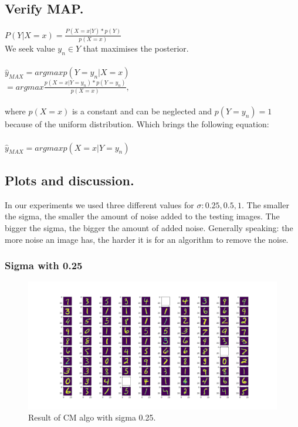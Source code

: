 \documentclass{article}
\begin{document}
\subsection{Verify MAP.}
$P(Y | X = x) = \frac{P( X = x | Y) * p(Y)}{p(X = x)}$\\
We seek value $y_n \in Y$ that maximises the posterior.\\\\
$\hat{y}_{MAX} = argmax p(Y = y_n | X = x)$\\
$ = argmax \frac{p(X = x | Y = y_n) * p(Y = y_n)}{p(X = x)},$\\\\
where $p(X = x)$ is a constant and can be neglected and $p(Y=y_n) = 1$ because of the uniform distribution. Which brings the following equation:\\\\
$\hat{y}_{MAX} = argmax p(X = x | Y = y_n)$\\


\subsection{Plots and discussion.}
In our experiments we used three different values for $\sigma: 0.25, 0.5, 1$. The smaller the sigma, the smaller the amount of noise added to the testing images. The bigger the sigma, the bigger the amount of added noise. Generally speaking: the more noise an image has, the harder it is for an algorithm to remove the noise.

\subsubsection{Sigma with 0.25}
\begin{figure}[h]
  \includegraphics[width=\linewidth]{sigma_025_cm.png}
  \caption{Result of CM algo with sigma 0.25.}
  \label{fig:cm025}
\end{figure}
\end{document}
